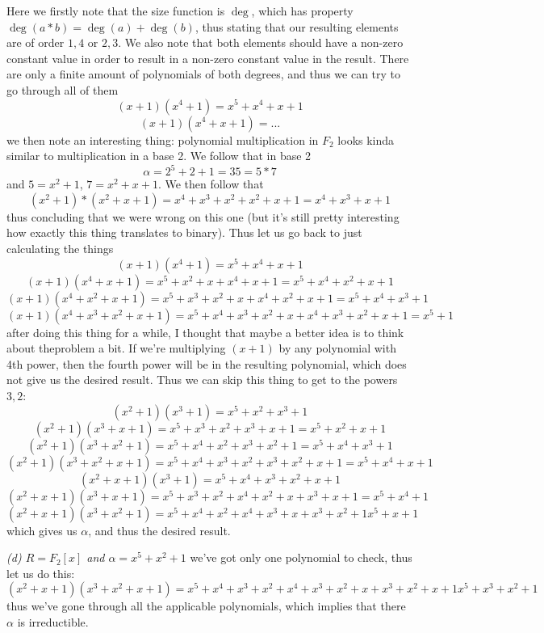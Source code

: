 \documentclass[11pt,oneside,titlepage]{book}
\begin{document}
Here we firstly note that the size function is $\deg$, which has
property $\deg(a * b) = \deg(a) + \deg(b)$, thus stating that our
resulting elements are of order $1, 4$ or $2, 3$. We also note that
both elements should have a non-zero constant value in order
to result in a non-zero constant value in the result. There
are only a finite amount of polynomials of both degrees, and thus
we can try to go through all of them
$$(x + 1) (x^4 + 1) = x^5 + x^4 + x + 1$$
$$(x + 1) (x^4 + x + 1) = ... $$
we then note an interesting thing: polynomial multiplication in $F_2$
looks kinda similar to multiplication in a base 2. We follow that in
base 2
$$\alpha = 2^5 + 2 + 1 = 35 = 5 * 7$$
and $5 = x^2 + 1$, $7 = x^2 + x + 1$. We then follow that
$$(x^2 + 1) * (x^2 + x + 1) =
x^4 + x^3 + x^2 + x^2 + x + 1 = x^4 + x^3 + x + 1$$ thus concluding
that we were wrong on this one (but it's still pretty interesting how
exactly this thing translates to binary). Thus let us go back to
just calculating the things
$$(x + 1) (x^4 + 1) = x^5 + x^4 + x + 1$$
$$(x + 1) (x^4 + x + 1) = x^5 + x^2 + x + x^4 + x + 1 = x^5 + x^4 + x^2 + x + 1$$
$$(x + 1) (x^4 + x^2 + x + 1) = x^5 + x^3 + x^2 + x + x^4 + x^2 + x + 1 = x^5 + x^4 + x^3 + 1$$
$$(x + 1) (x^4 + x^3 + x^2 + x + 1) =
x^5 + x^4 + x^3 + x^2 + x + x^4 + x^3 + x^2 + x + 1 = x^5 + 1$$
after doing this thing for a while, I thought that maybe a better idea
is to think about theproblem a bit. If we're multiplying $(x + 1)$ by any
polynomial with 4th power, then the fourth power will be in the resulting
polynomial, which does not give us the desired result. Thus we can
skip this thing to get to the powers $3, 2$:
$$(x^2 + 1) (x^3 + 1) = x^5 + x^2 + x^3 + 1$$
$$(x^2 + 1) (x^3 + x + 1) = x^5 + x^3 + x^2 + x^3 + x + 1 = x^5 + x^2 + x + 1$$
$$(x^2 + 1) (x^3 + x^2 + 1) = x^5 + x^4 + x^2 + x^3 + x^2 + 1 = x^5 + x^4 + x^3 + 1$$
$$(x^2 + 1) (x^3 + x^2 + x + 1) = x^5 + x^4 + x^3 + x^2 + x^3 + x^2 + x + 1 =
x^5 + x^4 + x + 1$$
$$(x^2 + x + 1) (x^3 + 1) = x^5 + x^4 + x^3 + x^2 + x + 1$$
$$(x^2 + x + 1) (x^3 + x + 1) = x^5 + x^3 + x^2 + x^4 + x^2 + x + x^3 + x + 1 =
x^5 + x^4 + 1$$
$$(x^2 + x + 1) (x^3 + x^2 + 1) = x^5 + x^4 + x^2 + x^4 + x^3 + x + x^3 + x^2 + 1
x^5 + x + 1$$
which gives us $\alpha$, and thus the desired result.

\textit{(d) $R = F_2[x]$ and $\alpha = x^5 + x^2 + 1$}
we've got only one polynomial to check, thus let us do this:
$$(x^2 + x + 1) (x^3 + x^2 + x + 1) = x^5 + x^4 + x^3 + x^2 + x^4 + x^3 + x^2 + x + x^3 + x^2 + x + 1
x^5 + x^3 + x^2 + 1$$
thus we've gone through all the applicable polynomials, which implies that
there $\alpha$ is irreductible. 
\end{document}
